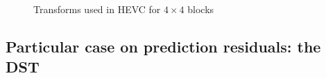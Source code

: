 \documentclass[11pt,a4paper,openright,twoside]{book}
\numberwithin{equation}{section} %
\begin{document}
\begin{figure}[tb]
	\centering
	\hspace{0.2\linewidth}
	\caption{Transforms used in \ac{HEVC} for $4\times4$ blocks}
	\label{fig:dct_dst}
\end{figure}

\subsection{Particular case on prediction residuals: the \acs{DST}}
\label{sub:particular_case_dst}
\end{document}
